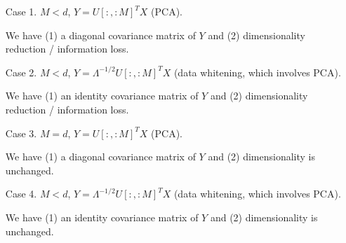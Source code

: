 \documentclass{article}
\begin{document}
\begin{itemize}[itemindent=2em]
	
	\item[Case 1.] $M < d$, $Y = U[:,:M]^T X$ (PCA). 
	
	We have (1) a diagonal covariance matrix of $Y$ and (2) dimensionality reduction / information loss.
	
	\item[Case 2.] $M < d$, $Y = \Lambda^{-1/2} U[:,:M]^T X$ (data whitening, which involves PCA).
	
	We have (1) an identity covariance matrix of $Y$ and (2) dimensionality reduction / information loss.
	
	\item[Case 3.] $M = d$, $Y = U[:,:M]^T X$ (PCA). 
	
	We have (1) a diagonal covariance matrix of $Y$ and (2) dimensionality is unchanged.
	
	\item[Case 4.] $M < d$, $Y = \Lambda^{-1/2} U[:,:M]^T X$ (data whitening, which involves PCA).
	
	We have (1) an identity covariance matrix of $Y$ and (2) dimensionality is unchanged.
\end{itemize}
\end{document}
